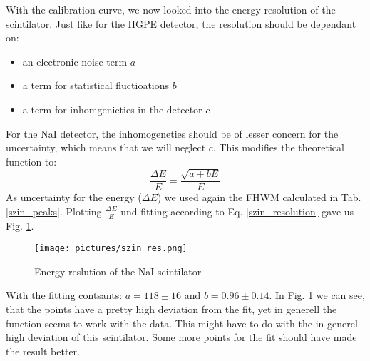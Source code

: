 With the calibration curve, we now looked into the energy resolution of the scintilator.
Just like for the HGPE detector, the resolution should be dependant on:
\begin{itemize}
\item an electronic noise term $a$
\item a term for statistical fluctioations $b$
\item a term for inhomgenieties in the detector $c$
\end{itemize}
For the NaI detector, the inhomogeneties should be of lesser concern for the uncertainty, which means that we will neglect $c$.
This modifies the theoretical function to:
\begin{equation}
\frac{\Delta E}{E} = \frac{\sqrt{a + bE }}{E}
\label{szin_resolution}
\end{equation}
As uncertainty for the energy ($\Delta E$) we used again the FHWM calculated in Tab. \ref{szin_peaks}.
Plotting $\frac{\Delta E}{E}$ und fitting according to Eq. \ref{szin_resolution} gave us Fig. \ref{szin_res}.

\begin{figure}[h]
  \texttt{[image: pictures/szin\_res.png]}
  \caption{Energy reslution of the NaI scintilator}
  \label{szin_res}
\end{figure}
With the fitting contsants: $a = 118 \pm 16$ and $b = 0.96 \pm 0.14$.
In Fig. \ref{szin_res} we can see, that the points have a pretty high deviation from the fit, yet in generell the function seems to work with the data.
This might have to do with the in generel high deviation of this scintilator.
Some more points for the fit should have made the result better.

\clearpage
